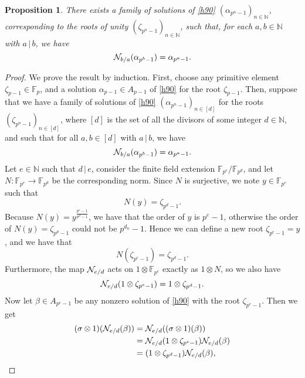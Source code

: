 \documentclass{sig-alternate}
\newtheorem{proposition}{Proposition}
\begin{document}
\begin{proposition}
  There exists a family of solutions of \eqref{h90}
  $(\alpha_{p^n-1})_{n\in\mathbb{N}}$, corresponding to the roots of unity
  $(\zeta_{p^n-1})_{n\in\mathbb{N}}$, such that, for each $a,b\in\mathbb{N}$
  with $a\,|\,b$, we have
  \[
    \mathcal{N}_{b/a}(\alpha_{p^b-1})=\alpha_{p^a-1}.
  \]
\end{proposition}
\begin{proof}


  We prove the result by induction. First, choose any primitive element
  $\zeta_{p-1}\in\mathbb{F}_p$, and a solution $\alpha_{p-1}\in
  A_{p-1}$ of \eqref{h90} for the root $\zeta_{p-1}$. Then, suppose that we have
  a family of solutions of \eqref{h90} $(\alpha_{p^n-1})_{n\in \left[ d
  \right]}$ for the roots
  $(\zeta_{p^n-1})_{n\in \left[ d \right]}$, where $\left[ d \right]$ is
  the set of all the divisors of some integer $d\in\mathbb{N}$, and such that for all $a,
  b\in \left[ d \right]$ with $a\,|\,b$, we have
  \[
    \mathcal{N}_{b/a}(\alpha_{p^b-1})=\alpha_{p^a-1}.
  \]
  Let $e\in\mathbb{N}$ such that $d\,|\,e$, consider the
  finite field extension $\mathbb{F}_{p^{e}}/\mathbb{F}_{p^{d}}$, and
  let $N:\mathbb{F}_{p^{e}}\to\mathbb{F}_{p^{d}}$ be the corresponding
  norm. Since $N$ is surjective, we note $y\in\mathbb{F}_{p^{e}}$ such
  that
  \[
    N(y) = \zeta_{p^{d}-1}.
  \]
  Because $N(y)=y^{\frac{p^{e}-1}{p^{d}-1}}$, we have that the order of
  $y$ is $p^{e}-1$, otherwise the order of $N(y)=\zeta_{p^{d}-1}$ could not
  be $p^{d_n}-1$. Hence we can define a new root $\zeta_{p^{e}-1}=y$, and we
  have that
  \[
    N(\zeta_{p^{e}-1})=\zeta_{p^{d}-1}.
  \]
  Furthermore, the map $\mathcal{N}_{e/d}$ acts on
  $1\otimes\mathbb{F}_{p^{e}}$ exactly as $1\otimes N$, so we also have
  \[
    \mathcal{N}_{e/d}(1\otimes\zeta_{p^{e}-1}) = 1\otimes\zeta_{p^{d}-1}.
  \]
Now let
$\beta\in A_{p^{e}-1}$ be any nonzero solution of \eqref{h90} with the root
$\zeta_{p^{e}-1}$.
Then we get
\begin{align*}
  (\sigma\otimes1)(\mathcal{N}_{e/d}(\beta)) &= \mathcal{N}_{e/d}((\sigma\otimes1)(\beta)) \\
  &= \mathcal{N}_{e/d}(1\otimes\zeta_{p^{e}-1}) \mathcal{N}_{e/d}(\beta) \\
  &= (1\otimes\zeta_{p^{d}-1})\mathcal{N}_{e/d}(\beta),
\end{align*}

\end{proof}
\end{document}

